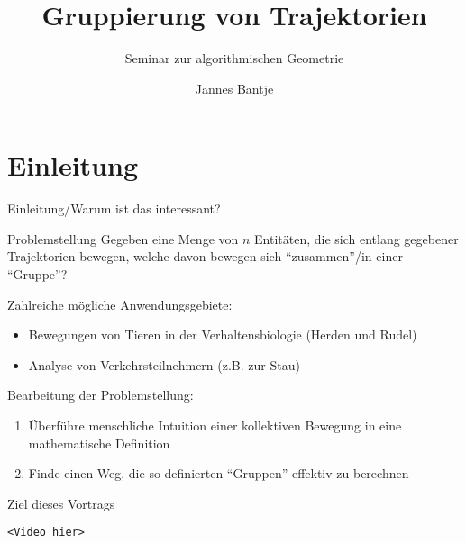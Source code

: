 \documentclass[
wide,
10pt,
xcolor={x11names,svgnames},
hyperref={pdfauthor={Jannes Bantje},colorlinks,urlcolor=maincolor,hidelinks=false,linkcolor=maincolor},
pantone312, 	%
]{beamer}
\theoremstyle{definition}
\begin{document}
\makeatletter
\author{Jannes Bantje} \let\Author\@author
\title{Gruppierung von Trajektorien}
\subtitle{Seminar zur algorithmischen Geometrie}
\makeatother


\begin{frame}[plain]
  \maketitle
\end{frame}

\section{Einleitung}
\begin{frame}{Einleitung/Warum ist das interessant?}
    \begin{block}{Problemstellung}
        Gegeben eine Menge von $n$ Entitäten, die sich entlang gegebener Trajektorien bewegen, welche davon bewegen sich \enquote{zusammen}/in einer \enquote{Gruppe}?
    \end{block}
    Zahlreiche mögliche Anwendungsgebiete:
    \begin{itemize}
        \item Bewegungen von Tieren in der Verhaltensbiologie (Herden und Rudel)
        \item Analyse von Verkehrsteilnehmern (z.B. zur Stau)
    \end{itemize}
    Bearbeitung der Problemstellung:
    \begin{enumerate}
        \item Überführe menschliche Intuition einer kollektiven Bewegung in eine mathematische Definition
        \item Finde einen Weg, die so definierten \enquote{Gruppen} effektiv zu berechnen
    \end{enumerate}
\end{frame}

\begin{frame}{Ziel dieses Vortrags}
    \begin{center}
        \texttt{<Video hier>}
    \end{center}
\end{frame}
\end{document}
